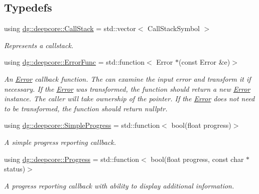 \subsection*{Typedefs}
\begin{DoxyCompactItemize}
\item 
using \hyperlink{group___utility_module_gabdf2d70ae3aab3c57142eddec69a725c}{dg\+::deepcore\+::\+Call\+Stack} = std\+::vector$<$ Call\+Stack\+Symbol $>$
\begin{DoxyCompactList}\small\item\em Represents a callstack. \end{DoxyCompactList}\item 
using \hyperlink{group___utility_module_gaa93ea71a4ed4c044369d3b323aec4435}{dg\+::deepcore\+::\+Error\+Func} = std\+::function$<$ Error $\ast$(const Error \&e)$>$
\begin{DoxyCompactList}\small\item\em An \hyperlink{classdg_1_1deepcore_1_1_error}{Error} callback function. The can examine the input error and transform it if necessary. If the \hyperlink{classdg_1_1deepcore_1_1_error}{Error} was transformed, the function should return a new \hyperlink{classdg_1_1deepcore_1_1_error}{Error} instance. The caller will take ownership of the pointer. If the \hyperlink{classdg_1_1deepcore_1_1_error}{Error} does not need to be transformed, the function should return nullptr. \end{DoxyCompactList}\item 
using \hyperlink{group___utility_module_ga6763018df79e4bdbcd8cd14cea5342b2}{dg\+::deepcore\+::\+Simple\+Progress} = std\+::function$<$ bool(float progress)$>$
\begin{DoxyCompactList}\small\item\em A simple progress reporting callback. \end{DoxyCompactList}\item 
using \hyperlink{group___utility_module_gae07fce8a40a5222a0dcd537a0b28a008}{dg\+::deepcore\+::\+Progress} = std\+::function$<$ bool(float progress, const char $\ast$status)$>$
\begin{DoxyCompactList}\small\item\em A progress reporting callback with ability to display additional information. \end{DoxyCompactList}\end{DoxyCompactItemize}
